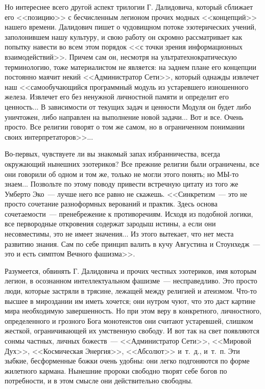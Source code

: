 \documentclass{scrbook}
\newcommand{\flqq}{<<}
\newcommand{\frqq}{>>}
\newcommand{\mdash}{~--- }
\begin{document}
Но интереснее всего другой аспект трилогии Г. Далидовича, который сближает его {\flqq}позицию{\frqq} с бесчисленным легионом прочих модных {\flqq}концепций{\frqq} нашего времени. Далидович пишет о чудовищном потоке эзотерических учений, заполонившем нашу культуру, и свою работу он скромно рассматривает как попытку навести во всем этом порядок {\flqq}с точки зрения информационных взаимодействий{\frqq}. Причем сам он, несмотря на ультратехнократическую терминологию, тоже материалистом не является: на заднем плане его концепции постоянно маячит некий {\flqq}Администратор Сети{\frqq}, который однажды извлечет наш {\flqq}самообучающийся программный модуль из устаревшего изношенного железа. Извлечет его без ненужной личностной памяти и определит его ценность... В зависимости от текущих задач и ценности Модуля он будет либо уничтожен, либо направлен на выполнение новой задачи... Вот и все. Очень просто. Все религии говорят о том же самом, но в ограниченном понимании своих интерпретаторов{\frqq}...

Во-первых, чувствуете ли вы знакомый запах избранничества, всегда окружающий нынешних эзотериков? Все прежние религии были ограничены, все они говорили об одном и том же, только не могли этого понять; но МЫ-то знаем... Позвольте по этому поводу привести встречную цитату из того же Умберто Эко{\mdash}лучше него все равно не скажешь. {\flqq}Синкретизм{\mdash}это не просто сочетание разноформных верований и практик. Здесь основа сочетаемости{\mdash}пренебрежение к противоречиям. Исходя из подобной логики, все первородные откровения содержат зародыш истины, а если они несовместимы, это не имеет значения... Из этого вытекает, что нет места развитию знания. Сам по себе принцип валить в кучу Августина и Стоунхедж{\mdash}это и есть симптом Вечного фашизма{\frqq}.

Разумеется, обвинять Г. Далидовича и прочих честных эзотериков, имя которым легион, в осознанном интеллектуальном фашизме{\mdash}несправедливо. Это просто люди, которые застряли в трясине, лежащей между религией и атеизмом. Что-то высшее в мироздании им иметь хочется; они нутром чуют, что это даст картине мира необходимую завершенность. Но при этом веру в конкретного, личностного, определенного и грозного Бога монотеистов они считают устаревшей, слишком жесткой, ограничивающей их умственную свободу. И вот так на свет появляются сонмы частных, личных божеств{\mdash}{\flqq}Администратор Сети{\frqq}, {\flqq}Мировой Дух{\frqq}, {\flqq}Космическая Энергия{\frqq}, {\flqq}Абсолют{\frqq} и~т.~д., и~т.~п. Эти зыбкие, бесформенные божки очень удобны: они легко подгоняются по форме жилетного кармана. Нынешние пророки свободно творят себе богов по потребности, и в этом смысле они действительно свободны.
\end{document}
